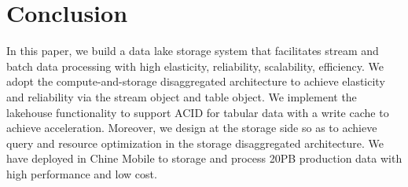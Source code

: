 \section{Conclusion} 
\label{sec:con}

In this paper, we build a data lake storage system \sys that facilitates stream and batch data processing with high elasticity, reliability, scalability, efficiency. We adopt the compute-and-storage disaggregated architecture to achieve  elasticity and reliability via the stream object and table object. We implement the lakehouse functionality to support ACID for tabular data with a  write cache to achieve acceleration.  Moreover, we design \brain at the storage side so as to achieve query and resource optimization in the storage  disaggregated architecture. We have deployed \sys in Chine Mobile to storage and process 20PB production data with high performance and low cost.